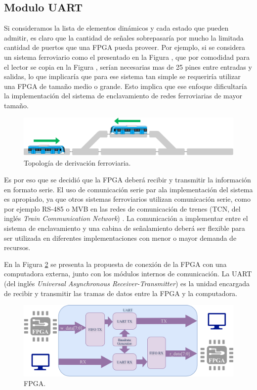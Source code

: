 \subsection{Modulo UART}
\label{sec:UART}
	Si consideramos la lista de elementos dinámicos y cada estado que pueden admitir, es claro que la cantidad de señales sobrepasaría por mucho la limitada cantidad de puertos que una FPGA pueda proveer. Por ejemplo, si se considera un sistema ferroviario como el presentado en la Figura \label{fig:bypass_1}, que por comodidad para el lector se copia en la Figura \label{fig:bypass_3}, serían necesarias mas de 25 pines entre entradas y salidas, lo que implicaría que para ese sistema tan simple se requeriría utilizar una FPGA de tamaño medio o grande. Esto implica que ese enfoque dificultaría la implementación del sistema de enclavamiento de redes ferroviarias de mayor tamaño.
	
	\begin{figure}[H]
		\centering
		\includegraphics[width=1\textwidth]{Figuras/bypass}
		\centering\caption{Topología de derivación ferroviaria.}
		\label{fig:bypass_3}
	\end{figure}
	
	Es por eso que se decidió que la FPGA deberá recibir y transmitir la información en formato serie. El uso de comunicación serie par ala implementación del sistema es apropiado, ya que otros sistemas ferroviarios utilizan comunicación serie, como por ejemplo RS-485 o MVB en las redes de comunicación de trenes (TCN, del inglés \textit{Train Communication Network}) \cite{TCN}. La comunicación a implementar entre el sistema de enclavamiento y una cabina de señalamiento deberá ser flexible para ser utilizada en diferentes implementaciones con menor o mayor demanda de recursos.
	
	En la Figura \ref{fig:GeneralCom} se presenta la propuesta de conexión de la FPGA con una computadora externa, junto con los módulos internos de comunicación. La UART (del inglés \textit{Universal Asynchronous Receiver-Transmitter}) es la unidad encargada de recibir y transmitir las tramas de datos entre la FPGA y la computadora.
	
	\begin{figure}[H]
		\centering
		\includegraphics[width=1\textwidth]{Figuras/UART_module.png}
		\centering\caption{FPGA.}
		\label{fig:GeneralCom}
	\end{figure}
	

